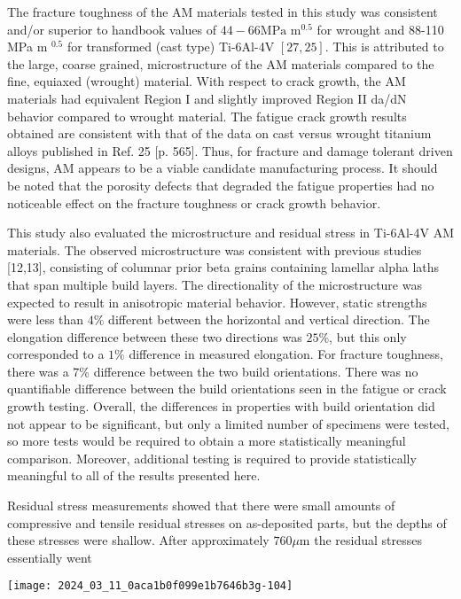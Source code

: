 \documentclass[10pt]{article}
\begin{document}
The fracture toughness of the AM materials tested in this study was consistent and/or superior to handbook values of $44-66 \mathrm{MPa}$ $\mathrm{m}^{0.5}$ for wrought and 88-110 MPa m ${ }^{0.5}$ for transformed (cast type) Ti-6Al-4V $[27,25]$. This is attributed to the large, coarse grained, microstructure of the AM materials compared to the fine, equiaxed (wrought) material. With respect to crack growth, the AM materials had equivalent Region I and slightly improved Region II da/dN behavior compared to wrought material. The fatigue crack growth results obtained are consistent with that of the data on cast versus wrought titanium alloys published in Ref. 25 [p. 565]. Thus, for fracture and damage tolerant driven designs, AM appears to be a viable candidate manufacturing process. It should be noted that the porosity defects that degraded the fatigue properties had no noticeable effect on the fracture toughness or crack growth behavior.

This study also evaluated the microstructure and residual stress in Ti-6Al-4V AM materials. The observed microstructure was consistent with previous studies [12,13], consisting of columnar prior beta grains containing lamellar alpha laths that span multiple build layers. The directionality of the microstructure was expected to result in anisotropic material behavior. However, static strengths were less than $4 \%$ different between the horizontal and vertical direction. The elongation difference between these two directions was $25 \%$, but this only corresponded to a $1 \%$ difference in measured elongation. For fracture toughness, there was a 7\% difference between the two build orientations. There was no quantifiable difference between the build orientations seen in the fatigue or crack growth testing. Overall, the differences in properties with build orientation did not appear to be significant, but only a limited number of specimens were tested, so more tests would be required to obtain a more statistically meaningful comparison. Moreover, additional testing is required to provide statistically meaningful to all of the results presented here.

Residual stress measurements showed that there were small amounts of compressive and tensile residual stresses on as-deposited parts, but the depths of these stresses were shallow. After approximately $760 \mu \mathrm{m}$ the residual stresses essentially went

\begin{center}
\texttt{[image: 2024\_03\_11\_0aca1b0f099e1b7646b3g-104]}
\end{center}
\end{document}
